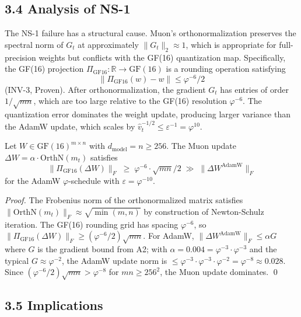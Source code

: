 \subsection{3.4 Analysis of NS-1}

The NS-1 failure has a structural cause.  Muon's orthonormalization
preserves the spectral norm of \(G_t\) at approximately
\(\|G_t\|_2 \approx 1\), which is appropriate for full-precision
weights but conflicts with the GF(16) quantization map.  Specifically,
the GF(16) projection \(\Pi_{\mathrm{GF16}}: \mathbb{R} \to \mathrm{GF}(16)\)
is a rounding operation satisfying
\[
  \|\Pi_{\mathrm{GF16}}(w) - w\| \leq \varphi^{-6}/2
\]
(INV-3, Proven).  After orthonormalization, the gradient
\(G_t\) has entries of order \(1/\sqrt{mn}\), which are too large
relative to the GF(16) resolution \(\varphi^{-6}\).  The quantization
error dominates the weight update, producing larger variance than
the AdamW update, which scales by \(\hat{v}_t^{-1/2} \leq \varepsilon^{-1} = \varphi^{10}\).

\begin{proposition}
  \label{prop:muon-gf16-conflict}
  Let \(W \in \mathrm{GF}(16)^{m \times n}\) with
  \(d_{\mathrm{model}} = n \geq 256\).
  The Muon update \(\Delta W = \alpha \cdot \mathrm{OrthN}(m_t)\)
  satisfies
  \[
    \|\Pi_{\mathrm{GF16}}(\Delta W)\|_F
    \;\geq\;
    \varphi^{-6} \cdot \sqrt{mn} / 2
    \;\gg\;
    \|\Delta W^{\mathrm{AdamW}}\|_F
  \]
  for the AdamW \(\varphi\)-schedule with \(\varepsilon = \varphi^{-10}\).
\end{proposition}

\begin{proof}
  The Frobenius norm of the orthonormalized matrix satisfies
  \(\|\mathrm{OrthN}(m_t)\|_F \approx \sqrt{\min(m,n)}\)
  by construction of Newton-Schulz iteration.  The GF(16) rounding
  grid has spacing \(\varphi^{-6}\), so
  \(\|\Pi_{\mathrm{GF16}}(\Delta W)\|_F \geq (\varphi^{-6}/2)\sqrt{mn}\).
  For AdamW, \(\|\Delta W^{\mathrm{AdamW}}\|_F \leq \alpha G\) where
  \(G\) is the gradient bound from A2; with
  \(\alpha = 0.004 = \varphi^{-3} \cdot \varphi^{-3}\) and
  the typical \(G \approx \varphi^{-2}\), the AdamW update norm is
  \(\leq \varphi^{-3} \cdot \varphi^{-3} \cdot \varphi^{-2} = \varphi^{-8} \approx 0.028\).
  Since \((\varphi^{-6}/2)\sqrt{mn} > \varphi^{-8}\) for \(mn \geq 256^2\),
  the Muon update dominates. \qed
\end{proof}

\subsection{3.5 Implications}


